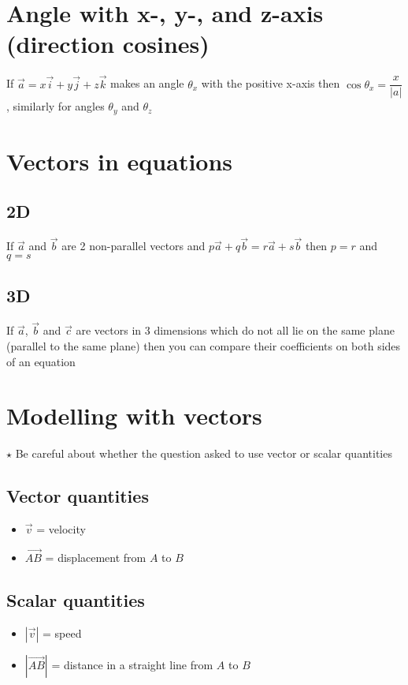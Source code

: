 \section{Angle with x-, y-, and z-axis (direction cosines)}
If $\vec{a}=x\vec{i}+y\vec{j}+z\vec{k}$ makes an angle $\theta_x$ with the positive x-axis then $\cos \theta_x=\dfrac{x}{|a|}$, similarly for angles $\theta_y$ and $\theta_z$
\section{Vectors in equations}
\subsection{2D}
If $\vec{a}$ and $\vec{b}$ are 2 non-parallel vectors and $p\vec{a}+q\vec{b}=r\vec{a}+s\vec{b}$ then $p=r$ and $q=s$
\subsection{3D}
If $\vec{a}$, $\vec{b}$ and $\vec{c}$ are vectors in 3 dimensions which do not all lie on the same plane (parallel to the same plane) then you can compare their coefficients on both sides of an equation

\section{Modelling with vectors}
$\star$ Be careful about whether the question asked to use vector or scalar quantities
\subsection{Vector quantities}
\begin{itemize}
    \item $\vec{v}$ = velocity
    \item $\overrightarrow{AB}$ = displacement from $A$ to $B$
\end{itemize}

\subsection{Scalar quantities}
\begin{itemize}
    \item $|\vec{v}|$ = speed
    \item $|\overrightarrow{AB}|$ = distance in a straight line from $A$ to $B$
\end{itemize}